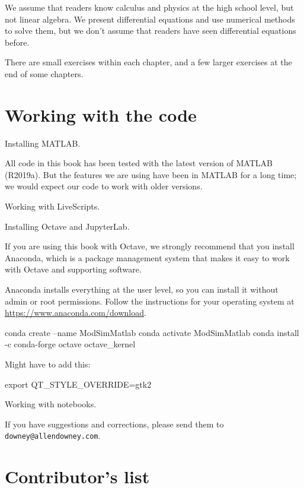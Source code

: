 \documentclass[
]{book}
\numberwithin{Answer}{chapter}
\numberwithin{Exercise}{chapter}
\begin{document}
We assume that readers know calculus and physics at the high school level, but not linear algebra.
We present differential equations and use numerical methods to solve them, but we don't assume that readers have seen differential equations before.

There are small exercises within each chapter, and a few larger
exercises at the end of some chapters.

\section*{Working with the code}

Installing MATLAB.

All code in this book has been tested with the latest version of MATLAB (R2019a).  But the features we are using have been in MATLAB for a long time; we would expect our code to work with older versions.


Working with LiveScripts.

Installing Octave and JupyterLab.

If you are using this book with Octave, we strongly recommend that you install Anaconda, which is a package management system that makes it easy to work with Octave and supporting software.

Anaconda installs everything at the user level, so you can install it without admin or root permissions.  Follow the instructions for your operating system at \url{https://www.anaconda.com/download}.

\begin{code}
conda create --name ModSimMatlab
conda activate ModSimMatlab
conda install -c conda-forge octave octave_kernel
\end{code}

Might have to add this:

\begin{code}
export QT_STYLE_OVERRIDE=gtk2
\end{code}


Working with notebooks.


If you have suggestions and corrections, please send them to
{\tt downey@allendowney.com}.



\newpage

\section*{Contributor's list}
\end{document}
